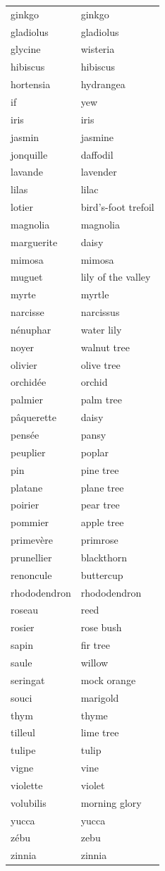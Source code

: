 \documentclass[12pt,a4paper]{article}
\begin{document}
\begin{longtable}{p{4cm} p{6cm}}
ginkgo & ginkgo \\
gladiolus & gladiolus \\
glycine & wisteria \\
hibiscus & hibiscus \\
hortensia & hydrangea \\
if & yew \\
iris & iris \\
jasmin & jasmine \\
jonquille & daffodil \\
lavande & lavender \\
lilas & lilac \\
lotier & bird's-foot trefoil \\
magnolia & magnolia \\
marguerite & daisy \\
mimosa & mimosa \\
muguet & lily of the valley \\
myrte & myrtle \\
narcisse & narcissus \\
nénuphar & water lily \\
noyer & walnut tree \\
olivier & olive tree \\
orchidée & orchid \\
palmier & palm tree \\
pâquerette & daisy \\
pensée & pansy \\
peuplier & poplar \\
pin & pine tree \\
platane & plane tree \\
poirier & pear tree \\
pommier & apple tree \\
primevère & primrose \\
prunellier & blackthorn \\
renoncule & buttercup \\
rhododendron & rhododendron \\
roseau & reed \\
rosier & rose bush \\
sapin & fir tree \\
saule & willow \\
seringat & mock orange \\
souci & marigold \\
thym & thyme \\
tilleul & lime tree \\
tulipe & tulip \\
vigne & vine \\
violette & violet \\
volubilis & morning glory \\
yucca & yucca \\
zébu & zebu \\
zinnia & zinnia \\
\bottomrule
\end{longtable}
\end{document}
